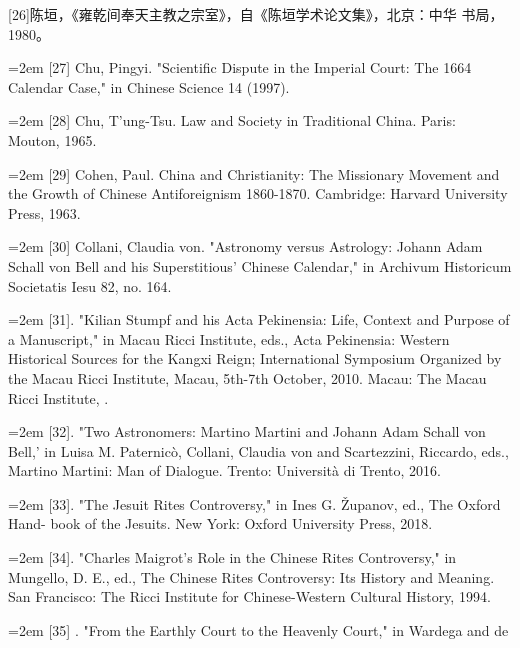 [26]陈垣，《雍乾间奉天主教之宗室》，自《陈垣学术论文集》，北京：中华%
书局，1980。%
\par
\noindent\hangindent=2em
[27] Chu, Pingyi. "Scientific Dispute in the Imperial Court: The 1664 Calendar%
\space%
Case," in Chinese Science 14 (1997).%
\par
\noindent\hangindent=2em
[28] Chu, T’ung-Tsu. Law and Society in Traditional China. Paris: Mouton, 1965.%
\par
\noindent\hangindent=2em
[29] Cohen, Paul. China and Christianity: The Missionary Movement and the Growth of%
\space%
Chinese Antiforeignism 1860-1870. Cambridge: Harvard University Press, 1963.%
\par
\noindent\hangindent=2em
[30] Collani, Claudia von. "Astronomy versus Astrology: Johann Adam Schall von%
\space%
Bell and his Superstitious' Chinese Calendar," in Archivum Historicum Societatis%
\space%
Iesu 82, no. 164.%
\par
\noindent\hangindent=2em
[31]. "Kilian Stumpf and his Acta Pekinensia: Life, Context and Purpose of a%
\space%
Manuscript," in Macau Ricci Institute, eds., Acta Pekinensia: Western Historical%
\space%
Sources for the Kangxi Reign; International Symposium Organized by the Macau%
\space%
Ricci Institute, Macau, 5th-7th October, 2010. Macau: The Macau Ricci Institute,%
.%
\par
\noindent\hangindent=2em
[32]. "Two Astronomers: Martino Martini and Johann Adam Schall von Bell,'%
in Luisa M. Paternicò, Collani, Claudia von and Scartezzini, Riccardo, eds.,%
\space%
Martino Martini: Man of Dialogue. Trento: Università di Trento, 2016.%
\par
\noindent\hangindent=2em
[33]. "The Jesuit Rites Controversy," in Ines G. Županov, ed., The Oxford Hand-%
book of the Jesuits. New York: Oxford University Press, 2018.%
\par
\noindent\hangindent=2em
[34]. "Charles Maigrot's Role in the Chinese Rites Controversy," in Mungello, D.%
\space%
E., ed., The Chinese Rites Controversy: Its History and Meaning. San Francisco: The%
\space%
Ricci Institute for Chinese-Western Cultural History, 1994.%
\par
\noindent\hangindent=2em
[35] . "From the Earthly Court to the Heavenly Court," in Wardega and de%
